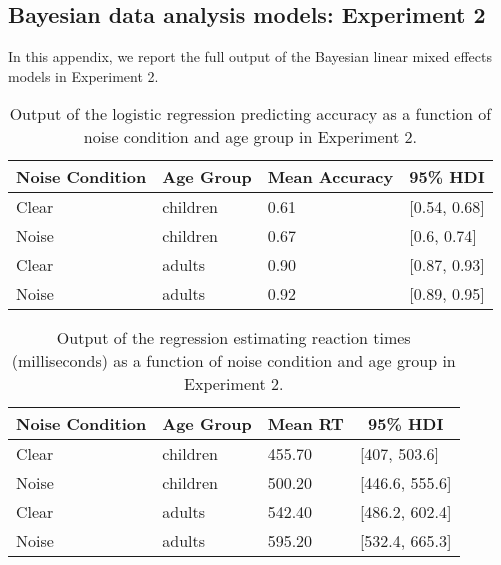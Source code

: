 \documentclass[,man,floatsintext]{apa6}
\begin{document}
\begin{appendix}
\hypertarget{bayesian-data-analysis-models-experiment-2}{%
\section{Bayesian data analysis models: Experiment
2}\label{bayesian-data-analysis-models-experiment-2}}

In this appendix, we report the full output of the Bayesian linear mixed
effects models in Experiment 2.

\begin{table}[h]
\begin{center}
\begin{threeparttable}
\caption{\label{tab:noise-acc-model}Output of the logistic regression predicting accuracy as a function of noise condition and age group in Experiment 2.}
\begin{tabular}{llll}
\toprule
Noise Condition & \multicolumn{1}{c}{Age Group} & \multicolumn{1}{c}{Mean Accuracy} & \multicolumn{1}{c}{95\% HDI}\\
\midrule
Clear & children & 0.61 & [0.54, 0.68]\\
Noise & children & 0.67 & [0.6, 0.74]\\
Clear & adults & 0.90 & [0.87, 0.93]\\
Noise & adults & 0.92 & [0.89, 0.95]\\
\bottomrule
\end{tabular}
\end{threeparttable}
\end{center}
\end{table}

\begin{table}[h]
\begin{center}
\begin{threeparttable}
\caption{\label{tab:noise-rt-model}Output of the regression estimating reaction times (milliseconds) as a function of noise condition and age group in Experiment 2.}
\begin{tabular}{llll}
\toprule
Noise Condition & \multicolumn{1}{c}{Age Group} & \multicolumn{1}{c}{Mean RT} & \multicolumn{1}{c}{95\% HDI}\\
\midrule
Clear & children & 455.70 & [407, 503.6]\\
Noise & children & 500.20 & [446.6, 555.6]\\
Clear & adults & 542.40 & [486.2, 602.4]\\
Noise & adults & 595.20 & [532.4, 665.3]\\
\bottomrule
\end{tabular}
\end{threeparttable}
\end{center}
\end{table}


\end{appendix}
\end{document}
